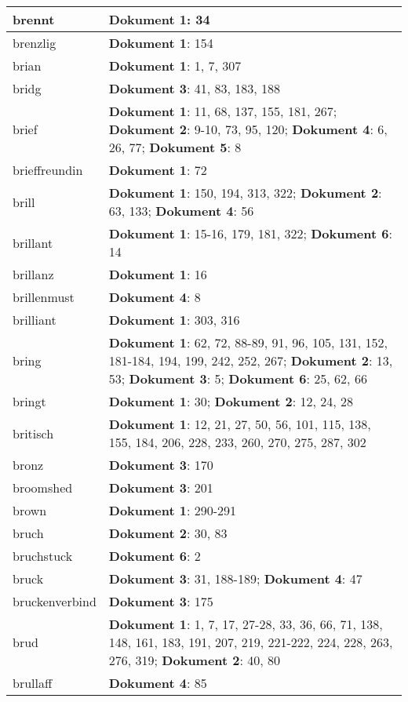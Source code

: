 \documentclass[a5paper]{article}
\begin{document}
\begin{longtable}[l]{|l|p{3in}|}
\hline
brennt & \textbf{Dokument 1}: 34 \\
\hline
brenzlig & \textbf{Dokument 1}: 154 \\
\hline
brian & \textbf{Dokument 1}: 1, 7, 307 \\
\hline
bridg & \textbf{Dokument 3}: 41, 83, 183, 188 \\
\hline
brief & \textbf{Dokument 1}: 11, 68, 137, 155, 181, 267; \textbf{Dokument 2}: 9-10, 73, 95, 120; \textbf{Dokument 4}: 6, 26, 77; \textbf{Dokument 5}: 8 \\
\hline
brieffreundin & \textbf{Dokument 1}: 72 \\
\hline
brill & \textbf{Dokument 1}: 150, 194, 313, 322; \textbf{Dokument 2}: 63, 133; \textbf{Dokument 4}: 56 \\
\hline
brillant & \textbf{Dokument 1}: 15-16, 179, 181, 322; \textbf{Dokument 6}: 14 \\
\hline
brillanz & \textbf{Dokument 1}: 16 \\
\hline
brillenmust & \textbf{Dokument 4}: 8 \\
\hline
brilliant & \textbf{Dokument 1}: 303, 316 \\
\hline
bring & \textbf{Dokument 1}: 62, 72, 88-89, 91, 96, 105, 131, 152, 181-184, 194, 199, 242, 252, 267; \textbf{Dokument 2}: 13, 53; \textbf{Dokument 3}: 5; \textbf{Dokument 6}: 25, 62, 66 \\
\hline
bringt & \textbf{Dokument 1}: 30; \textbf{Dokument 2}: 12, 24, 28 \\
\hline
britisch & \textbf{Dokument 1}: 12, 21, 27, 50, 56, 101, 115, 138, 155, 184, 206, 228, 233, 260, 270, 275, 287, 302 \\
\hline
bronz & \textbf{Dokument 3}: 170 \\
\hline
broomshed & \textbf{Dokument 3}: 201 \\
\hline
brown & \textbf{Dokument 1}: 290-291 \\
\hline
bruch & \textbf{Dokument 2}: 30, 83 \\
\hline
bruchstuck & \textbf{Dokument 6}: 2 \\
\hline
bruck & \textbf{Dokument 3}: 31, 188-189; \textbf{Dokument 4}: 47 \\
\hline
bruckenverbind & \textbf{Dokument 3}: 175 \\
\hline
brud & \textbf{Dokument 1}: 1, 7, 17, 27-28, 33, 36, 66, 71, 138, 148, 161, 183, 191, 207, 219, 221-222, 224, 228, 263, 276, 319; \textbf{Dokument 2}: 40, 80 \\
\hline
brullaff & \textbf{Dokument 4}: 85 \\

\end{longtable}
\end{document}
